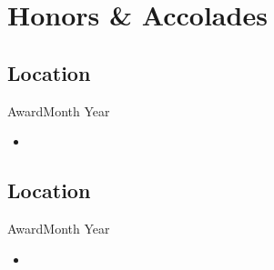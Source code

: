 \section{Honors \& Accolades}
\subsection{Location}{Award}{Month Year}
\begin{itemize}
    \item \lipsum[3][2-4]
\end{itemize}
\subsection{Location}{Award}{Month Year}
\begin{itemize}
    \item \lipsum[5][2-4]
\end{itemize}